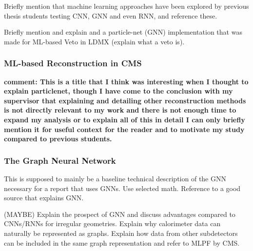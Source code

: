 Briefly mention that machine learning approaches have been explored by previous thesis students testing CNN, GNN and even RNN, and reference these. 

Briefly mention and explain and a particle-net (GNN) implementation that was made for ML-based Veto in LDMX (explain what a veto is). 


\subsubsection{ML-based Reconstruction in CMS}

\textbf{comment: This is a title that I think was interesting when I thought to explain particlenet, though I have come to the conclusion with my supervisor that explaining and detailing other reconstruction methods is not directly relevant to my work and there is not enough time to expand my analysis or to explain all of this in detail I can only briefly mention it for useful context for the reader and to motivate my study compared to previous students.}



\subsubsection{The Graph Neural Network}

This is supposed to mainly be a baseline technical description of the GNN necessary for a report that uses GNNs. Use selected math. Reference to a good source that explains GNN.

(MAYBE) Explain the prospect of GNN and discuss advantages compared to CNNs/RNNs for irregular geometries. Explain why calorimeter data can naturally be represented as graphs. Explain how data from other subdetectors can be included in the same graph representation and refer to MLPF by CMS.

